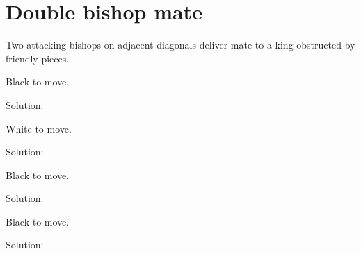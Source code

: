 \documentclass{book}
\begin{document}
\section{Double bishop mate}
Two attacking bishops on adjacent diagonals deliver mate to a king obstructed by friendly pieces.\begin{multicols}{2} 
\begin{samepage} 
\newgame 


 
\showboard
 
 Black to move. 
 
Solution: 
 
\end{samepage}\begin{samepage} 
\newgame 


 
\showboard
 
 White to move. 
 
Solution: 
 
\end{samepage}\begin{samepage} 
\newgame 


 
\showboard
 
 Black to move. 
 
Solution: 
 
\end{samepage}\begin{samepage} 
\newgame 


 
\showboard
 
 Black to move. 
 
Solution: 
 
\end{samepage}\end{multicols} 
\newpage 
\end{document}

